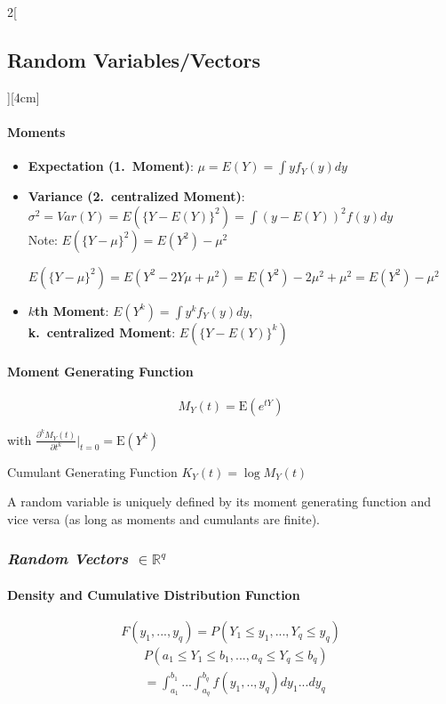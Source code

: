\documentclass[8pt]{extarticle}
\begin{document}
\begin{multicols}{2}[\subsection{Random Variables/Vectors}][4cm]
\paragraph{Moments}

\begin{itemize}
\item \textbf{Expectation (1.\ Moment)}: $\mu = E(Y) = \int y f_Y(y)dy$
\item \textbf{Variance (2.\ centralized Moment)}: $\sigma^2 = Var(Y) = E(\{Y-E(Y)\}^2) = \int (y - E(Y))^2 f(y) dy$ \\
Note: $E(\{Y-\mu\}^2) = E(Y^2) - \mu^2$
\begin{Proof}
$E(\{Y-\mu\}^2) = E(Y^2 - 2Y\mu + \mu^2) = E(Y^2) - 2\mu^2 + \mu^2 = E(Y^2) - \mu^2$
\end{Proof}
\item \textbf{$k$th Moment}: $E(Y^k) = \int y^k f_Y(y) dy$,\\ \textbf{k.\ centralized Moment}: $E(\{Y-E(Y)\}^k)$
\end{itemize}

\paragraph{Moment Generating Function }

$$M_Y(t) = \mathrm{E}(e^{tY})$$

with $\frac{\partial^kM_Y(t)}{\partial t^k} \bigg|_{t = 0} = \mathrm{E}(Y^k)$ 

Cumulant Generating Function $K_Y(t) = \log M_Y(t)$

\noindent A random variable is uniquely defined by its moment generating function and vice versa (as long as moments and cumulants are finite).
  
\subsubsection*{\textit{Random Vectors $\in \mathbb{R}^q$}}

\paragraph{Density and Cumulative Distribution Function}

$$F(y_1, ..., y_q) = P(Y_1 \leq y_1, ..., Y_q \leq y_q)$$
\begin{align*}
& P(a_1 \leq Y_1 \leq b_1, ..., a_q \leq Y_q \leq b_q) \\
& = \int_{a_1}^{b_1} ...\int_{a_q}^{b_q} f(y_1, .., y_q)dy_1...dy_q
\end{align*}


\end{multicols}
\end{document}
